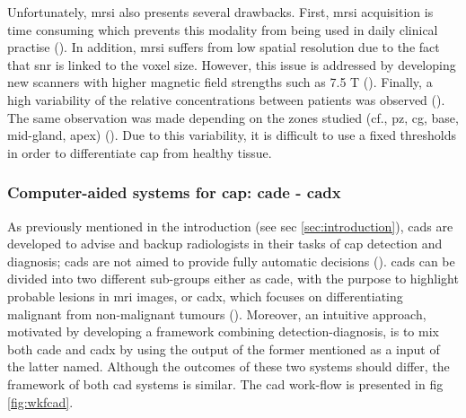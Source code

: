 \begin{enumerate}[leftmargin=*]
Unfortunately, \ac{mrsi} also presents several drawbacks. First, \ac{mrsi} acquisition is time consuming which prevents this modality from being used in daily clinical practise (\cite{Barentsz2012}). In addition, \ac{mrsi} suffers from low spatial resolution due to the fact that \ac{snr} is linked to the voxel size. However, this issue is addressed by developing new scanners with higher magnetic field strengths such as 7.5 T (\cite{Giskeodegard2013}). Finally, a high variability of the relative concentrations between patients was observed (\cite{Choi2007}). The same observation was made depending on the zones studied (cf., \ac{pz}, \ac{cg}, base, mid-gland, apex) (\cite{Walker2010,Lemaitre2011}). Due to this variability, it is difficult to use a fixed thresholds in order to differentiate \ac{cap} from healthy tissue.

\end{enumerate}

\subsubsection{Computer-aided systems for \ac{cap}: \ac{cade} - \ac{cadx}} \label{subsubsec:CAD}

As previously mentioned in the introduction (see \acs{sec} \ref{sec:introduction}), \acp{cad} are developed to advise and backup radiologists in their tasks of \ac{cap} detection and diagnosis; \acp{cad} are not aimed to provide fully automatic decisions (\cite{Giger2008}). \acp{cad} can be divided into two different sub-groups either as \ac{cade}, with the purpose to highlight probable lesions in \ac{mri} images, or \ac{cadx}, which focuses on differentiating malignant from non-malignant tumours (\cite{Giger2008}). Moreover, an intuitive approach, motivated by developing a framework combining detection-diagnosis, is to mix both \ac{cade} and \ac{cadx} by using the output of the former mentioned as a input of the latter named. Although the outcomes of these two systems should differ, the framework of both \ac{cad} systems is similar. The \ac{cad} work-flow is presented in \acs{fig} \ref{fig:wkfcad}.

